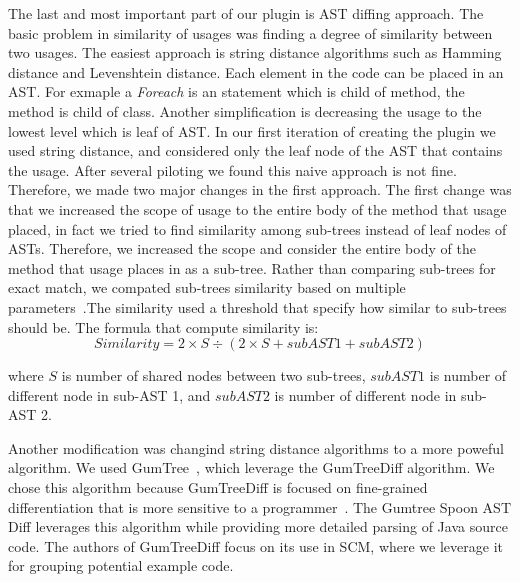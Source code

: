 \documentclass[conference]{IEEEtran}
\begin{document}
The last and most important part of our plugin is AST diffing approach. The basic problem in similarity of usages was finding a degree of similarity between two usages. The easiest approach is string distance algorithms such as Hamming distance and Levenshtein distance. Each element in the code can be placed in an AST. For exmaple a \textit{Foreach} is an statement which is child of method, the method is child of class. Another simplification is decreasing the usage to the lowest level which is leaf of AST. In our first iteration of creating the plugin we used string distance, and considered only the leaf node of the AST that contains the usage. After several piloting we found this naive approach is not fine. Therefore, we made two major changes in the first approach. The first change was that we increased the scope of usage to the entire body of the method that usage placed, in fact we tried to find similarity among sub-trees instead of leaf nodes of ASTs. Therefore, we increased the scope and consider the entire body of the method that usage places in as a sub-tree. Rather than comparing sub-trees for exact match, we compated sub-trees similarity based on multiple parameters~\cite{baxter1998clone}.The similarity used a threshold that specify how similar to sub-trees should be. The formula that compute similarity is:
\begin{equation}
Similarity = 2 \times S  \div (2  \times S  + subAST1 + subAST2)
\label{equation1}
\end{equation}

where $S$ is number of shared nodes between two sub-trees, $subAST1$ is number of different node in sub-AST 1, and $subAST2$ is number of different node in sub-AST 2. \par
Another modification was changind string distance algorithms to a more poweful algorithm. We used GumTree~\cite{baxter1998clone,DBLP:conf/kbse/FalleriMBMM14,falleri2014fine}, which leverage the GumTreeDiff algorithm. We chose this algorithm because GumTreeDiff is focused on fine-grained differentiation that is more sensitive to a programmer~\cite{falleri2014fine}. The Gumtree Spoon AST Diff leverages this algorithm while providing more detailed parsing of Java source code. The authors of GumTreeDiff focus on its use in SCM, where we leverage it for grouping potential example code. \par
\end{document}
